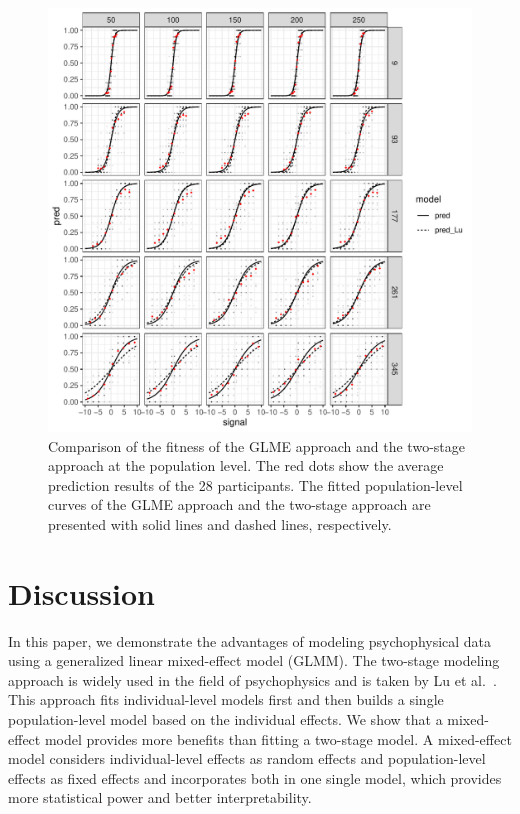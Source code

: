 \begin{knitrout}
\color{fgcolor}\begin{figure}
\includegraphics[width=\maxwidth]{figure/model_compare_plot-1} \caption[Comparison of the fitness of the GLME approach and the two-stage approach at the population level]{Comparison of the fitness of the GLME approach and the two-stage approach at the population level. The red dots show the average prediction results of the 28 participants. The fitted population-level curves of the GLME approach and the two-stage approach are presented with solid lines and dashed lines, respectively.}\label{fig:model_compare_plot}
\end{figure}

\end{knitrout}


\section{Discussion}

In this paper, we demonstrate the advantages of modeling psychophysical data using a generalized linear mixed-effect model (GLMM). The two-stage modeling approach is widely used in the field of psychophysics and is taken by Lu et al.\ \cite{JNDVIS21}. This approach fits individual-level models first and then builds a single population-level model based on the individual effects. We show that a mixed-effect model provides more benefits than fitting a two-stage model. A mixed-effect model considers individual-level effects as random effects and population-level effects as fixed effects and incorporates both in one single model, which provides more statistical power and better interpretability.

